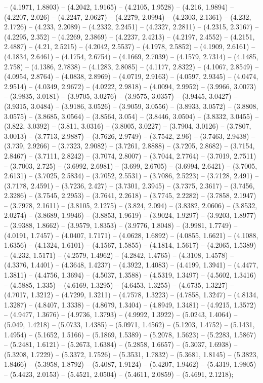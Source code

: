 -- (4.1971, 1.8803) -- (4.2042, 1.9165) -- (4.2105, 1.9528) -- (4.216, 1.9894) -- (4.2207, 2.026) -- (4.2247, 2.0627) -- (4.2279, 2.0994) -- (4.2303, 2.1361) -- (4.232, 2.1726) -- (4.233, 2.2089) -- (4.2332, 2.2451) -- (4.2327, 2.2811) -- (4.2315, 2.3167) -- (4.2295, 2.352) -- (4.2269, 2.3869) -- (4.2237, 2.4213) -- (4.2197, 2.4552) -- (4.2151, 2.4887) -- (4.21, 2.5215) -- (4.2042, 2.5537) -- (4.1978, 2.5852) -- (4.1909, 2.6161) -- (4.1834, 2.6461) -- (4.1754, 2.6754) -- (4.1669, 2.7039) -- (4.1579, 2.7314) -- (4.1485, 2.758) -- (4.1386, 2.7838) -- (4.1283, 2.8085) -- (4.1177, 2.8322) -- (4.1067, 2.8549) -- (4.0954, 2.8764) -- (4.0838, 2.8969) -- (4.0719, 2.9163) -- (4.0597, 2.9345) -- (4.0474, 2.9514) -- (4.0349, 2.9672) -- (4.0222, 2.9818) -- (4.0094, 2.9952) -- (3.9966, 3.0073) -- (3.9835, 3.0181) -- (3.9705, 3.0276) -- (3.9575, 3.0357) -- (3.9445, 3.0427) -- (3.9315, 3.0484) -- (3.9186, 3.0526) -- (3.9059, 3.0556) -- (3.8933, 3.0572) -- (3.8808, 3.0575) -- (3.8685, 3.0564) -- (3.8564, 3.054) -- (3.8446, 3.0504) -- (3.8332, 3.0455) -- (3.822, 3.0392) -- (3.811, 3.0316) -- (3.8005, 3.0227) -- (3.7904, 3.0126) -- (3.7807, 3.0013) -- (3.7713, 2.9887) -- (3.7626, 2.9749) -- (3.7542, 2.96) -- (3.7463, 2.9438) -- (3.739, 2.9266) -- (3.7323, 2.9082) -- (3.7261, 2.8888) -- (3.7205, 2.8682) -- (3.7154, 2.8467) -- (3.7111, 2.8242) -- (3.7074, 2.8007) -- (3.7044, 2.7764) -- (3.7019, 2.7511) -- (3.7003, 2.725) -- (3.6992, 2.6981) -- (3.699, 2.6705) -- (3.6994, 2.6421) -- (3.7005, 2.6131) -- (3.7025, 2.5834) -- (3.7052, 2.5531) -- (3.7086, 2.5223) -- (3.7128, 2.491) -- (3.7178, 2.4591) -- (3.7236, 2.427) -- (3.7301, 2.3945) -- (3.7375, 2.3617) -- (3.7456, 2.3286) -- (3.7545, 2.2953) -- (3.7641, 2.2618) -- (3.7745, 2.2282) -- (3.7858, 2.1947) -- (3.7978, 2.1611) -- (3.8105, 2.1275) -- (3.824, 2.094) -- (3.8382, 2.0606) -- (3.8532, 2.0274) -- (3.8689, 1.9946) -- (3.8853, 1.9619) -- (3.9024, 1.9297) -- (3.9203, 1.8977) -- (3.9388, 1.8662) -- (3.9579, 1.8353) -- (3.9776, 1.8048) -- (3.9981, 1.7749) -- (4.0191, 1.7457) -- (4.0407, 1.7171) -- (4.0628, 1.6892) -- (4.0855, 1.6621) -- (4.1088, 1.6356) -- (4.1324, 1.6101) -- (4.1567, 1.5855) -- (4.1814, 1.5617) -- (4.2065, 1.5389) -- (4.232, 1.5171) -- (4.2579, 1.4962) -- (4.2842, 1.4765) -- (4.3108, 1.4578) -- (4.3376, 1.4401) -- (4.3648, 1.4237) -- (4.3922, 1.4083) -- (4.4199, 1.3941) -- (4.4477, 1.3811) -- (4.4756, 1.3694) -- (4.5037, 1.3588) -- (4.5319, 1.3497) -- (4.5602, 1.3416) -- (4.5885, 1.335) -- (4.6169, 1.3295) -- (4.6453, 1.3255) -- (4.6735, 1.3227) -- (4.7017, 1.3212) -- (4.7299, 1.3211) -- (4.7578, 1.3223) -- (4.7858, 1.3247) -- (4.8134, 1.3287) -- (4.8407, 1.3338) -- (4.8679, 1.3404) -- (4.8949, 1.3481) -- (4.9215, 1.3572) -- (4.9477, 1.3676) -- (4.9736, 1.3793) -- (4.9992, 1.3922) -- (5.0243, 1.4064) -- (5.049, 1.4218) -- (5.0733, 1.4385) -- (5.0971, 1.4562) -- (5.1203, 1.4752) -- (5.1431, 1.4954) -- (5.1652, 1.5166) -- (5.1869, 1.5389) -- (5.2078, 1.5623) -- (5.2283, 1.5867) -- (5.2481, 1.6121) -- (5.2673, 1.6384) -- (5.2858, 1.6657) -- (5.3037, 1.6938) -- (5.3208, 1.7229) -- (5.3372, 1.7526) -- (5.3531, 1.7832) -- (5.3681, 1.8145) -- (5.3823, 1.8466) -- (5.3958, 1.8792) -- (5.4087, 1.9124) -- (5.4207, 1.9462) -- (5.4319, 1.9805) -- (5.4423, 2.0153) -- (5.4521, 2.0504) -- (5.4611, 2.0859) -- (5.4691, 2.1218);
